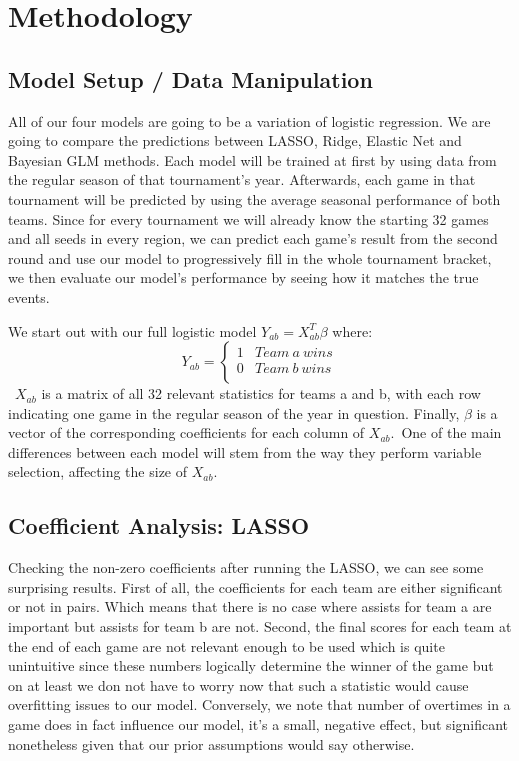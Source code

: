 \documentclass{article} %
\begin{document}
\section{Methodology}
\label{gen_inst}

\subsection{Model Setup / Data Manipulation}
All of our four models are going to be a variation of logistic regression. We are going to compare the predictions between LASSO, Ridge, Elastic Net and Bayesian GLM methods. Each model will be trained at first by using data from the regular season of that tournament's year. Afterwards, each game in that tournament will be predicted by using the average seasonal performance of both teams. Since for every tournament we will already know the starting 32 games and all seeds in every region, we can predict each game's result from the second round and use our model to progressively fill in the whole tournament bracket, we then evaluate our model's performance by seeing how it matches the true events.

We start out with our full logistic model $Y_{ab} = X_{ab}^T \beta$ where:\
\[ Y_{ab} = \left\{
\begin{array}{ll}
1 & Team \ a \ wins \\
0 &  Team \ b \ wins \\
\end{array} 
\right. \]\
$X_{ab}$ is a matrix of all 32 relevant statistics for teams a and b, with each row indicating one game in the regular season of the year in question. Finally, $\beta$ is a vector of the corresponding coefficients for each column of $X_{ab}$.\ One of the main differences between each model will stem from the way they perform variable selection, affecting the size of $X_{ab}$.

\subsection{Coefficient Analysis: LASSO}

Checking the non-zero coefficients after running the LASSO, we can see some surprising results. 
First of all, the coefficients for each team are either significant or not in pairs. Which means that there is no case where assists for team a are important but assists for team b are not. Second, the final scores for each team at the end of each game are not relevant enough to be used which is quite unintuitive since these numbers logically determine the winner of the game but on at least we don not have to worry now that such a statistic would cause overfitting issues to our model. Conversely, we note that number of overtimes in a game does in fact influence our model, it's a small, negative effect, but significant nonetheless given that our prior assumptions would say otherwise. \
\end{document}
